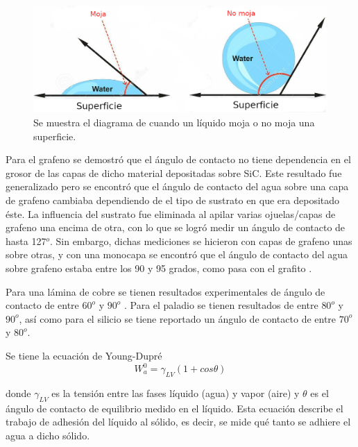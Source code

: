 \documentclass[twocolumn,letterpaper,aps,pra,10pt]{revtex4-1}
\begin{document}
\begin{figure}[h]
\centering
\includegraphics[scale=0.7]{AnguloMojado.png}
\caption{Se muestra el diagrama de cuando un líquido moja o no moja una superficie.}
\end{figure}


Para el grafeno se demostró que el ángulo de contacto no tiene dependencia en el grosor de las capas de dicho material depositadas sobre SiC\cite{WCA2}. Este resultado fue generalizado pero se encontró que el ángulo de contacto del agua sobre una capa de grafeno cambiaba dependiendo de el tipo de sustrato en que era depositado éste\cite{WCA3}\cite{WCA4}.
La influencia del sustrato fue eliminada al apilar varias ojuelas/capas de grafeno una encima de otra, con lo que se logró medir un ángulo de contacto de hasta 127$^{o}$. Sin embargo, dichas mediciones se hicieron con capas de grafeno unas sobre otras, y con una monocapa se encontró que el ángulo de contacto del agua sobre grafeno estaba entre los 90 y 95 grados, como pasa con el grafito \cite{WCA5}.

Para una lámina de cobre se tienen resultados experimentales de ángulo de contacto de entre $60^{o}$ y $90^{o}$ \cite{WCA6} \cite{WCA7}. Para el paladio se tienen resultados de entre $80^{o}$ y $90^{o}$\cite{WCA8}, así como para el silicio se tiene reportado un ángulo de contacto de entre $70^{o}$ y $80^{o}$\cite{WCA8}.

Se tiene la ecuación de Young-Dupré
\begin{equation}\label{Young}
W_{a}^{0} = \gamma_{LV}(1 + cos\theta ) 
\end{equation}

donde $\gamma_{LV}$ es la tensión entre las fases líquido (agua) y vapor (aire) y $\theta$ es el ángulo de contacto de equilibrio medido en el líquido. Esta ecuación describe el trabajo de adhesión del líquido al sólido, es decir, se mide qué tanto se adhiere el agua a dicho sólido\cite{YoungD}.
\end{document}
